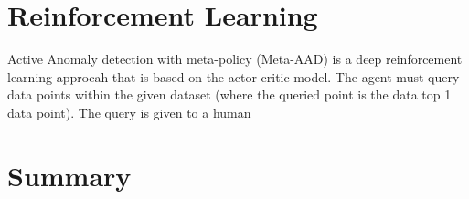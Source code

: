 \section{Reinforcement Learning}
Active Anomaly detection with meta-policy (Meta-AAD) is a deep reinforcement learning approcah that is based on the actor-critic model. The agent must query data points within the given dataset (where the queried point is the data top 1 data point). The query is given to a human 


\section{Summary}

